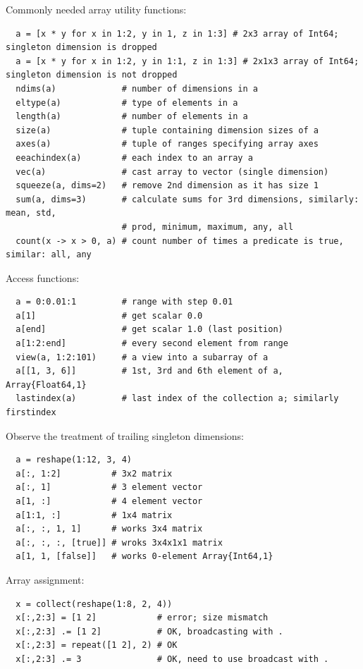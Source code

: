 \documentclass[10pt,a4paper]{article}
\begin{document}
Commonly needed array utility functions:
\begin{lstlisting}
  a = [x * y for x in 1:2, y in 1, z in 1:3] # 2x3 array of Int64; singleton dimension is dropped
  a = [x * y for x in 1:2, y in 1:1, z in 1:3] # 2x1x3 array of Int64; singleton dimension is not dropped
  ndims(a)             # number of dimensions in a
  eltype(a)            # type of elements in a
  length(a)            # number of elements in a
  size(a)              # tuple containing dimension sizes of a
  axes(a)              # tuple of ranges specifying array axes
  eeachindex(a)        # each index to an array a
  vec(a)               # cast array to vector (single dimension)
  squeeze(a, dims=2)   # remove 2nd dimension as it has size 1
  sum(a, dims=3)       # calculate sums for 3rd dimensions, similarly: mean, std,
                       # prod, minimum, maximum, any, all
  count(x -> x > 0, a) # count number of times a predicate is true, similar: all, any
\end{lstlisting}

Access functions:
\begin{lstlisting}
  a = 0:0.01:1         # range with step 0.01
  a[1]                 # get scalar 0.0
  a[end]               # get scalar 1.0 (last position)
  a[1:2:end]           # every second element from range
  view(a, 1:2:101)     # a view into a subarray of a
  a[[1, 3, 6]]         # 1st, 3rd and 6th element of a, Array{Float64,1}
  lastindex(a)         # last index of the collection a; similarly firstindex
\end{lstlisting}

Observe the treatment of trailing singleton dimensions:
\begin{lstlisting}
  a = reshape(1:12, 3, 4)
  a[:, 1:2]          # 3x2 matrix
  a[:, 1]            # 3 element vector
  a[1, :]            # 4 element vector
  a[1:1, :]          # 1x4 matrix
  a[:, :, 1, 1]      # works 3x4 matrix
  a[:, :, :, [true]] # wroks 3x4x1x1 matrix
  a[1, 1, [false]]   # works 0-element Array{Int64,1}
\end{lstlisting}

Array assignment:
\begin{lstlisting}
  x = collect(reshape(1:8, 2, 4))
  x[:,2:3] = [1 2]            # error; size mismatch
  x[:,2:3] .= [1 2]           # OK, broadcasting with .
  x[:,2:3] = repeat([1 2], 2) # OK
  x[:,2:3] .= 3               # OK, need to use broadcast with .
\end{lstlisting}
\end{document}
